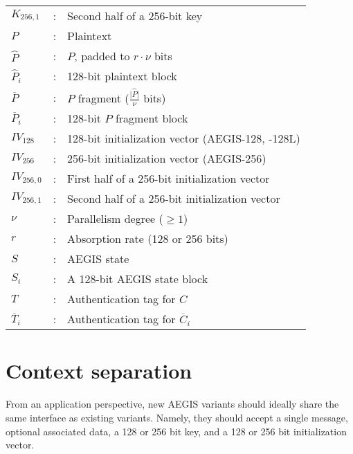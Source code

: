 \documentclass[envcountsame,runningheads,notitlepage]{llncs}
\begin{document}
\begin{tabular}{l c p{}}
  $K_{256,1}$           & : & Second half of a 256-bit key                                    \\
  $P$                   & : & Plaintext                                                       \\
  $\hat{P}$             & : & $P$, padded to $r \cdot \nu$ bits                               \\
  $\hat{P}_i$           & : & 128-bit plaintext block                                         \\
  $\overline{P}$        & : & $P$ fragment ($\frac{\lvert \hat{P} \rvert}{\nu}$ bits)         \\
  $\overline{P}_i$      & : & 128-bit $P$ fragment block                                      \\
  $IV_{128}$            & : & 128-bit initialization vector (AEGIS-128, -128L)                \\
  $IV_{256}$            & : & 256-bit initialization vector  (AEGIS-256)                      \\
  $IV_{256,0}$          & : & First half of a 256-bit initialization vector                   \\
  $IV_{256,1}$          & : & Second half of a 256-bit initialization vector                  \\
  $\nu$                 & : & Parallelism degree ($\geq 1$)                                   \\
  $r$                   & : & Absorption rate (128 or 256 bits)                               \\
  $S$                   & : & AEGIS state                                                     \\
  $S_i$                 & : & A 128-bit AEGIS state block                                     \\
  $T$                   & : & Authentication tag for $C$                                      \\
  $\overline{T}_i$      & : & Authentication tag for $\overline{C}_i$                         \\
\end{tabular}

\section{Context separation}
\label{sec:context separation}

From an application perspective, new AEGIS variants should ideally share the same interface as existing variants. Namely, they should accept a single message, optional associated data, a 128 or 256 bit key, and a 128 or 256 bit initialization vector.
\end{document}
